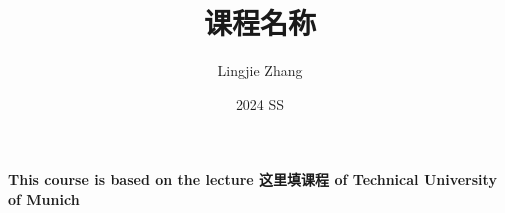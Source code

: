 \documentclass[12pt, a4paper, oneside]{article}
\title{课程名称}
\author{Lingjie Zhang}
\date{2024 SS}
\begin{document}
\maketitle

\centering
\textbf{This course is based on the lecture 这里填课程 of Technical University of Munich}

\raggedright

\tableofcontents
\newpage
{}
\end{document}
